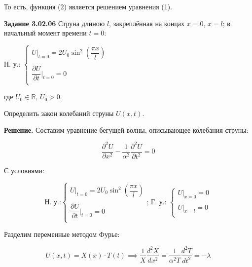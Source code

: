 \documentclass[a4paper, 12pt]{article}
\begin{document}
	\quad То есть, функция (2) является решением уравнения (1).
	
	\quad \textbf{Задание 3.02.06} Струна длиною $l$, закреплённая на концах $x = 0$, $x = l$; в начальный момент времени $t = 0$: 
	
	\begin{center}
		Н. у.: $
		\begin{cases}
			U \bigg|_{t = 0} = 2U_0 \sin^2 \left( \dfrac{\pi x}{l}\right) \\ 
			\\
			\dfrac{\partial U}{\partial t} \bigg|_{t = 0} = 0 \\
		\end{cases}$
		
		\text{}
		
		где $U_0 \in \mathbb{R}$, $U_0 > 0$. 
	\end{center}
	
	\quad Определить закон колебаний струны $U(x, t)$. 
	
	\quad \textbf{Решение.} Составим уравнение бегущей волны, описывающее колебания струны: 
	
	\begin{equation}
		\dfrac{\partial^2 U}{\partial x^2} - \dfrac{1}{\alpha^2} \dfrac{\partial^2 U}{\partial t^2}  = 0
	\end{equation}
	
	\quad С условиями:
	
	\begin{equation}
		\text{Н. у.:}\begin{cases}
			U\bigg|_{t=0} = 2U_0\sin^2\left(\dfrac{\pi x}{l}\right) \\
			\\
			\dfrac{\partial U}{\partial t}\bigg|_{t=0} = 0 \\
		\end{cases} \text{; Г. у.: } \begin{cases}
			U\bigg|_{x=0} = 0 \\
			\\
			U\bigg|_{x=l} = 0 \\ 
		\end{cases}
	\end{equation}
	
	\quad Разделим переменные методом Фурье: 
	
	\begin{equation}
		U(x, t) = X(x) \cdot T(t) \implies \dfrac{1}{X} \dfrac{d^2 X}{dx^2} = \dfrac{1}{\alpha^2 T} \dfrac{d^2 T}{dt^2} = -\lambda 
	\end{equation}
	
\end{document}
